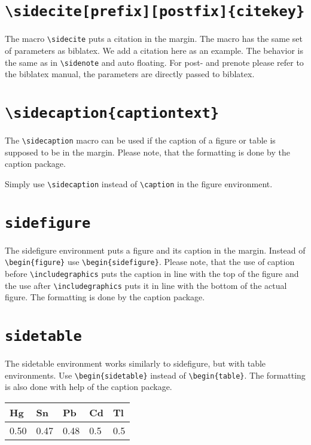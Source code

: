 \documentclass{book}
\begin{document}
\section{\texttt{\textbackslash sidecite[prefix][postfix]\{citekey\}}}
The macro \verb+\sidecite+ puts a citation in the margin. The macro has the same set of parameters as biblatex. We add a citation here as an example. The behavior is the same as in \verb+\sidenote+ and auto floating. For post- and prenote please refer to the biblatex manual, the parameters are directly passed to biblatex.

\section{\texttt{\textbackslash sidecaption\{captiontext\}}}
The \verb+\sidecaption+ macro can be used if the caption of a figure or table is supposed to be in the margin. Please note, that the formatting is done by the caption package. 
\begin{figure}[h]
\fbox{\rule{\textwidth}{0mm}\rule{0mm}{1.5cm}} %
\end{figure}
Simply use \verb+\sidecaption+ instead of \verb+\caption+ in the figure environment. 

\section{\texttt{sidefigure}}
The sidefigure environment puts a figure and its caption in the margin. Instead of \verb+\begin{figure}+ use \verb+\begin{sidefigure}+. Please note, that the use of caption before \verb+\includegraphics+ puts the caption in line with the top of the figure and the use after \verb+\includegraphics+ puts it in line with the bottom of the actual figure. The formatting is done by the caption package.
\begin{sidefigure}
\fbox{\rule{0mm}{1.2cm}\rule{\marginparwidth}{0mm}} %
\caption{This is a figure with its caption in the margin.}
\end{sidefigure}

\section{\texttt{sidetable}}
The sidetable environment works similarly to sidefigure, but with table environments. Use \verb+\begin{sidetable}+ instead of \verb+\begin{table}+. The formatting is also done with help of the caption package.
\begin{sidetable}
  \centering
  \begin{tabular}{lllll}
  \hline
     Hg&Sn&Pb&Cd&Tl \\
     \hline
    0.50&0.47&0.48&0.5&0.5\\
  \end{tabular}
  \caption{This is a table in the margin}
\end{sidetable}
\end{document}
